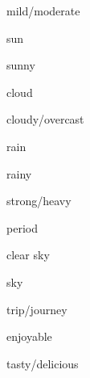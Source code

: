 \begin{flashcard}{\LARGE mild/moderate}
\LARGE {}
\end{flashcard}
\begin{flashcard}{\LARGE sun}
\LARGE {}
\end{flashcard}
\begin{flashcard}{\LARGE sunny}
\LARGE {}
\end{flashcard}
\begin{flashcard}{\LARGE cloud}
\LARGE {}
\end{flashcard}
\begin{flashcard}{\LARGE cloudy/overcast}
\LARGE {}
\end{flashcard}
\begin{flashcard}{\LARGE rain}
\LARGE {}
\end{flashcard}
\begin{flashcard}{\LARGE rainy}
\LARGE {}
\end{flashcard}
\begin{flashcard}{\LARGE strong/heavy}
\LARGE {}
\end{flashcard}
\begin{flashcard}{\LARGE period}
\LARGE {}
\end{flashcard}
\begin{flashcard}{\LARGE clear sky}
\LARGE {}
\end{flashcard}
\begin{flashcard}{\LARGE sky}
\LARGE {}
\end{flashcard}
\begin{flashcard}{\LARGE trip/journey}
\LARGE {}
\end{flashcard}
\begin{flashcard}{\LARGE enjoyable}
\LARGE {}
\end{flashcard}
\begin{flashcard}{\LARGE tasty/delicious}
\LARGE {}
\end{flashcard}
